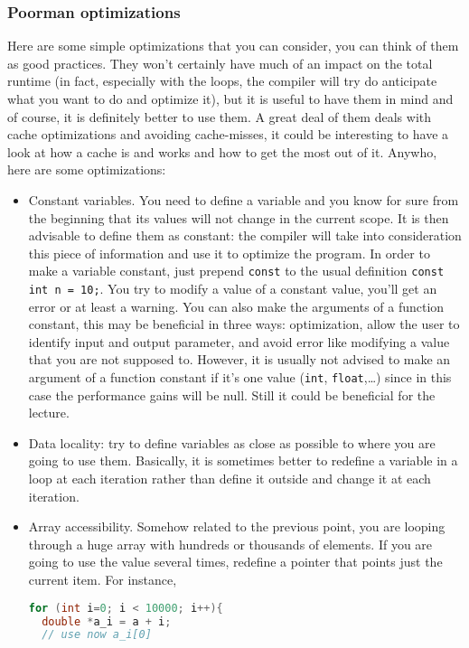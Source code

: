 \documentclass[a4paper,12pt,%
              final%
              ]{article}
\begin{document}
\subsubsection{Poorman optimizations}
  Here are some simple optimizations that you can consider, you can think of them as good practices. They won't certainly have much of an impact on the total runtime (in fact, especially with the loops, the compiler will try do anticipate what you want to do and optimize it), but it is useful to have them in mind and of course, it is definitely better to use them. A great deal of them deals with cache optimizations and avoiding cache-misses, it could be interesting to have a look at how a cache is and works and how to get the most out of it. Anywho, here are some optimizations:
    \begin{itemize}
      \item Constant variables. You need to define a variable and you know for sure from the beginning that its values will not change in the current scope. It is then advisable to define them as constant: the compiler will take into consideration this piece of information and use it to optimize the program. In order to make a variable constant, just prepend \texttt{const} to the usual definition \texttt{const int n = 10;}. You try to modify a value of a constant value, you'll get an error or at least a warning. You can also make the arguments of a function constant, this may be beneficial in three ways: optimization, allow the user to identify input and output parameter, and avoid error like modifying a value that you are not supposed to. However, it is usually not advised to make an argument of a function constant if it's one value (\texttt{int}, \texttt{float},\ldots) since in this case the performance gains will be null. Still it could be beneficial for the lecture.
      \item Data locality: try to define variables as close as possible to where you are going to use them. Basically, it is sometimes better to redefine a variable in a loop at each iteration rather than define it outside and change it at each iteration.
      \item Array accessibility. Somehow related to the previous point, you are looping through a huge array with hundreds or thousands of elements. If you are going to use the value several times, redefine a pointer that points just the current item. For instance,
\begin{lstlisting}[language=C]
for (int i=0; i < 10000; i++){
  double *a_i = a + i;
  // use now a_i[0]

\end{lstlisting}
\end{itemize}
\end{document}
